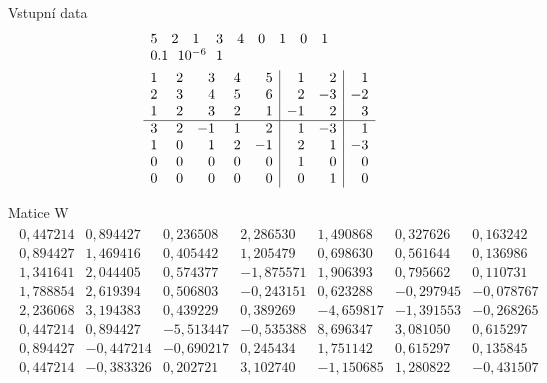 \begin{Example}{Vstupní data}%
\begin{align*}%
&\begin{array}{rrrrrrrrr}
 5 &  2 & 1 & 3 & 4 & 0 & 1 & 0 & 1 \\
\multicolumn{4}{r}{0.1 ~~ 10^{-6} ~~ 1}\\
\end{array}
\\
&\begin{array}{rrrrr|rr|r}
1 & ~2 &  3 & ~4 &  5 &  1 &  2 &  1 \\
2 &  3 &  4 &  5 &  6 &  2 & -3 & -2 \\
1 &  2 &  3 &  2 &  1 & -1 &  2 &  3 \\
\hline
3 &  2 & -1 &  1 &  2 &  1 & -3 &  1 \\
1 &  0 &  1 &  2 & -1 &  2 &  1 & -3 \\
0 &  0 &  0 &  0 &  0 &  1 &  0 &  0 \\
0 &  0 &  0 &  0 &  0 &  0 &  1 &  0 \\
\end{array}
\end{align*}
\end{Example}

\begin{Example}{Matice W}
  \begin{align*}
    \begin{array}{rr|r|rrrrrr}
      0,447214 &  0,894427 &  0,236508 &   2,286530 &  1,490868 &  0,327626 &  0,163242 \\
      0,894427 &  1,469416 &  0,405442 &   1,205479 &  0,698630 &  0,561644 &  0,136986 \\
      1,341641 &  2,044405 &  0,574377 &  -1,875571 &  1,906393 &  0,795662 &  0,110731 \\
      1,788854 &  2,619394 &  0,506803 &  -0,243151 &  0,623288 & -0,297945 & -0,078767 \\
      2,236068 &  3,194383 &  0,439229 &   0,389269 & -4,659817 & -1,391553 & -0,268265 \\
      0,447214 &  0,894427 & -5,513447 &  -0,535388 &  8,696347 &  3,081050 &  0,615297 \\
      0,894427 & -0,447214 & -0,690217 &   0,245434 &  1,751142 &  0,615297 &  0,135845 \\
      0,447214 & -0,383326 &  0,202721 &   3,102740 & -1,150685 &  1,280822 & -0,431507 \\
    \end{array}
  \end{align*}
\end{Example}

